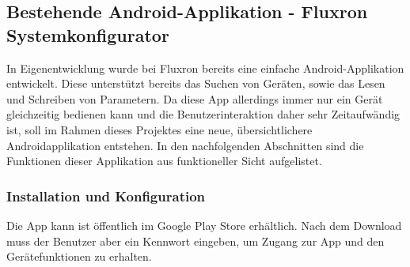 \subsection{Bestehende Android-Applikation - Fluxron Systemkonfigurator }
\label{subsec:Bestehende Smartphone-Applikation}
In Eigenentwicklung wurde bei Fluxron bereits eine einfache Android-Applikation entwickelt. Diese unterstützt bereits das Suchen von Geräten, sowie das Lesen und Schreiben von Parametern. Da diese App allerdings immer nur ein Gerät gleichzeitig bedienen kann und die Benutzerinteraktion daher sehr Zeitaufwändig ist, soll im Rahmen dieses Projektes eine neue, übersichtlichere Androidapplikation entstehen. In den nachfolgenden Abschnitten sind die Funktionen dieser Applikation aus funktioneller Sicht aufgelistet.

\subsubsection{Installation und Konfiguration}
\label{subsubsec:Installation und Konfiguration}
Die App kann ist öffentlich im Google Play Store erhältlich. Nach dem Download muss der Benutzer aber ein Kennwort eingeben, um Zugang zur App und den Gerätefunktionen zu erhalten.

